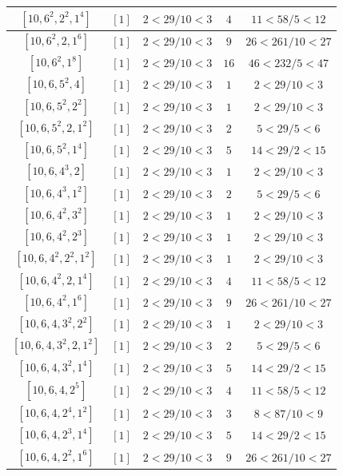 \documentclass{article}%
\begin{document}
\begin{center}
\begin{longtable}{||c|c|c|c|c||}
$[10, 6^{2}, 2^{2}, 1^{4}]$ & $[1]$ & $2 < 29/10 < 3$ & $4$ & $11 < 58/5 < 12$ \\ \hline 
$[10, 6^{2}, 2, 1^{6}]$ & $[1]$ & $2 < 29/10 < 3$ & $9$ & $26 < 261/10 < 27$ \\ \hline 
$[10, 6^{2}, 1^{8}]$ & $[1]$ & $2 < 29/10 < 3$ & $16$ & $46 < 232/5 < 47$ \\ \hline 
$[10, 6, 5^{2}, 4]$ & $[1]$ & $2 < 29/10 < 3$ & $1$ & $2 < 29/10 < 3$ \\ \hline 
$[10, 6, 5^{2}, 2^{2}]$ & $[1]$ & $2 < 29/10 < 3$ & $1$ & $2 < 29/10 < 3$ \\ \hline 
$[10, 6, 5^{2}, 2, 1^{2}]$ & $[1]$ & $2 < 29/10 < 3$ & $2$ & $5 < 29/5 < 6$ \\ \hline 
$[10, 6, 5^{2}, 1^{4}]$ & $[1]$ & $2 < 29/10 < 3$ & $5$ & $14 < 29/2 < 15$ \\ \hline 
$[10, 6, 4^{3}, 2]$ & $[1]$ & $2 < 29/10 < 3$ & $1$ & $2 < 29/10 < 3$ \\ \hline 
$[10, 6, 4^{3}, 1^{2}]$ & $[1]$ & $2 < 29/10 < 3$ & $2$ & $5 < 29/5 < 6$ \\ \hline 
$[10, 6, 4^{2}, 3^{2}]$ & $[1]$ & $2 < 29/10 < 3$ & $1$ & $2 < 29/10 < 3$ \\ \hline 
$[10, 6, 4^{2}, 2^{3}]$ & $[1]$ & $2 < 29/10 < 3$ & $1$ & $2 < 29/10 < 3$ \\ \hline 
$[10, 6, 4^{2}, 2^{2}, 1^{2}]$ & $[1]$ & $2 < 29/10 < 3$ & $1$ & $2 < 29/10 < 3$ \\ \hline 
$[10, 6, 4^{2}, 2, 1^{4}]$ & $[1]$ & $2 < 29/10 < 3$ & $4$ & $11 < 58/5 < 12$ \\ \hline 
$[10, 6, 4^{2}, 1^{6}]$ & $[1]$ & $2 < 29/10 < 3$ & $9$ & $26 < 261/10 < 27$ \\ \hline 
$[10, 6, 4, 3^{2}, 2^{2}]$ & $[1]$ & $2 < 29/10 < 3$ & $1$ & $2 < 29/10 < 3$ \\ \hline 
$[10, 6, 4, 3^{2}, 2, 1^{2}]$ & $[1]$ & $2 < 29/10 < 3$ & $2$ & $5 < 29/5 < 6$ \\ \hline 
$[10, 6, 4, 3^{2}, 1^{4}]$ & $[1]$ & $2 < 29/10 < 3$ & $5$ & $14 < 29/2 < 15$ \\ \hline 
$[10, 6, 4, 2^{5}]$ & $[1]$ & $2 < 29/10 < 3$ & $4$ & $11 < 58/5 < 12$ \\ \hline 
$[10, 6, 4, 2^{4}, 1^{2}]$ & $[1]$ & $2 < 29/10 < 3$ & $3$ & $8 < 87/10 < 9$ \\ \hline 
$[10, 6, 4, 2^{3}, 1^{4}]$ & $[1]$ & $2 < 29/10 < 3$ & $5$ & $14 < 29/2 < 15$ \\ \hline 
$[10, 6, 4, 2^{2}, 1^{6}]$ & $[1]$ & $2 < 29/10 < 3$ & $9$ & $26 < 261/10 < 27$ \\ \hline 

\end{longtable}
\end{center}
\end{document}
